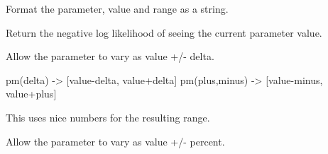 \documentclass[letterpaper,10pt,english]{sphinxmanual}
\begin{document}
\begin{fulllineitems}
\begin{fulllineitems}
\end{fulllineitems}


\begin{fulllineitems}
\label{api/mystic.parameter:refl1d.mystic.parameter.IntegerParameter.format}
Format the parameter, value and range as a string.

\end{fulllineitems}


\begin{fulllineitems}
\label{api/mystic.parameter:refl1d.mystic.parameter.IntegerParameter.nllf}
Return the negative log likelihood of seeing the current parameter value.

\end{fulllineitems}


\begin{fulllineitems}
\label{api/mystic.parameter:refl1d.mystic.parameter.IntegerParameter.parameters}
\end{fulllineitems}


\begin{fulllineitems}
\label{api/mystic.parameter:refl1d.mystic.parameter.IntegerParameter.pm}
Allow the parameter to vary as value +/- delta.

pm(delta) -\textgreater{} {[}value-delta, value+delta{]}
pm(plus,minus) -\textgreater{} {[}value-minus, value+plus{]}

This uses nice numbers for the resulting range.

\end{fulllineitems}


\begin{fulllineitems}
\label{api/mystic.parameter:refl1d.mystic.parameter.IntegerParameter.pmp}
Allow the parameter to vary as value +/- percent.


\end{fulllineitems}
\end{fulllineitems}
\end{document}
